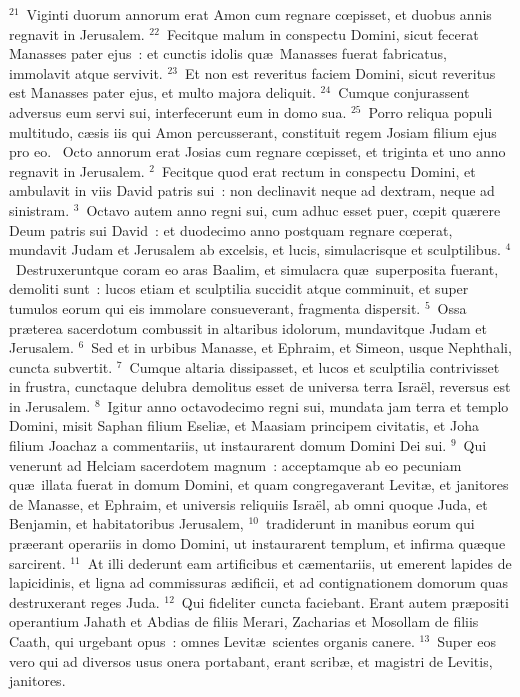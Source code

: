 ${}^{21}$~Viginti duorum annorum erat Amon cum regnare cœpisset, et duobus annis regnavit in Jerusalem.
${}^{22}$~Fecitque malum in conspectu Domini, sicut fecerat Manasses pater ejus~: et cunctis idolis qu\ae\ Manasses fuerat fabricatus, immolavit atque servivit.
${}^{23}$~Et non est reveritus faciem Domini, sicut reveritus est Manasses pater ejus, et multo majora deliquit.
${}^{24}$~Cumque conjurassent adversus eum servi sui, interfecerunt eum in domo sua.
${}^{25}$~Porro reliqua populi multitudo, c\ae sis iis qui Amon percusserant, constituit regem Josiam filium ejus pro eo.
~Octo annorum erat Josias cum regnare cœpisset, et triginta et uno anno regnavit in Jerusalem.
${}^{2}$~Fecitque quod erat rectum in conspectu Domini, et ambulavit in viis David patris sui~: non declinavit neque ad dextram, neque ad sinistram.
${}^{3}$~Octavo autem anno regni sui, cum adhuc esset puer, cœpit qu\ae rere Deum patris sui David~: et duodecimo anno postquam regnare cœperat, mundavit Judam et Jerusalem ab excelsis, et lucis, simulacrisque et sculptilibus.
${}^{4}$~Destruxeruntque coram eo aras Baalim, et simulacra qu\ae\ superposita fuerant, demoliti sunt~: lucos etiam et sculptilia succidit atque comminuit, et super tumulos eorum qui eis immolare consueverant, fragmenta dispersit.
${}^{5}$~Ossa pr\ae terea sacerdotum combussit in altaribus idolorum, mundavitque Judam et Jerusalem.
${}^{6}$~Sed et in urbibus Manasse, et Ephraim, et Simeon, usque Nephthali, cuncta subvertit.
${}^{7}$~Cumque altaria dissipasset, et lucos et sculptilia contrivisset in frustra, cunctaque delubra demolitus esset de universa terra Isra\"el, reversus est in Jerusalem.
${}^{8}$~Igitur anno octavodecimo regni sui, mundata jam terra et templo Domini, misit Saphan filium Eseli\ae , et Maasiam principem civitatis, et Joha filium Joachaz a commentariis, ut instaurarent domum Domini Dei sui.
${}^{9}$~Qui venerunt ad Helciam sacerdotem magnum~: acceptamque ab eo pecuniam qu\ae\ illata fuerat in domum Domini, et quam congregaverant Levit\ae , et janitores de Manasse, et Ephraim, et universis reliquiis Isra\"el, ab omni quoque Juda, et Benjamin, et habitatoribus Jerusalem,
${}^{10}$~tradiderunt in manibus eorum qui pr\ae erant operariis in domo Domini, ut instaurarent templum, et infirma qu\ae que sarcirent.
${}^{11}$~At illi dederunt eam artificibus et c\ae mentariis, ut emerent lapides de lapicidinis, et ligna ad commissuras \ae dificii, et ad contignationem domorum quas destruxerant reges Juda.
${}^{12}$~Qui fideliter cuncta faciebant. Erant autem pr\ae positi operantium Jahath et Abdias de filiis Merari, Zacharias et Mosollam de filiis Caath, qui urgebant opus~: omnes Levit\ae\ scientes organis canere.
${}^{13}$~Super eos vero qui ad diversos usus onera portabant, erant scrib\ae , et magistri de Levitis, janitores.


